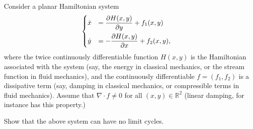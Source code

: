 \begin{exercise}
Consider a planar Hamiltonian system
\begin{align}
	\begin{dcases}
	\dot{x} &= \frac{\partial H(x,y)}{\partial y} + f_1(x,y) \\
	\dot{y} &= - \frac{\partial H(x,y)}{\partial x} + f_2(x,y),
	\end{dcases}
\end{align}
where the twice continuously differentiable function $H(x,y)$ is the Hamiltonian associated with the system (say, the energy in classical mechanics, or the stream function in fluid mechanics), and the continuously differentiable ${f} = (f_1, f_2)$ is a dissipative term (say, damping in classical mechanics, or compressible terms in fluid mechanics). Assume that $\nabla \cdot {f} \neq 0$ for all $(x,y) \in \mathbb{R}^2$ (linear damping, for instance has this property.)

Show that the above system can have no limit cycles.
	
\end{exercise}


